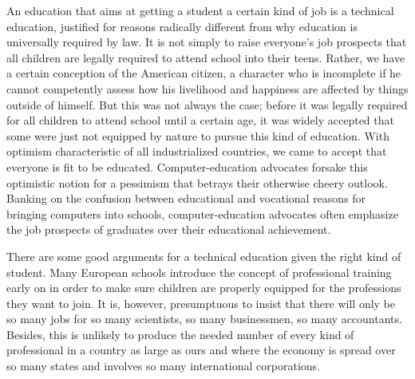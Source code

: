 An education that aims at getting a student a certain kind of job is a technical education, justified for reasons radically different from why education is universally required by law. It is not simply to raise everyone’s job prospects that all children are legally required to attend school into their teens. Rather, we have a certain conception of the American citizen, a character who is incomplete if he cannot competently assess how his livelihood and happiness are affected by things outside of himself. But this was not always the case; before it was legally required for all children to attend school until a certain age, it was widely accepted that some were just not equipped by nature to pursue this kind of education. With optimism characteristic of all industrialized countries, we came to accept that everyone is fit to be educated. Computer-education advocates forsake this optimistic notion for a pessimism that betrays their otherwise cheery outlook. Banking on the confusion between educational and vocational reasons for bringing computers into schools, computer-education advocates often emphasize the job prospects of graduates over their educational achievement.

There are some good arguments for a technical education given the right kind of student. Many European schools introduce the concept of professional training early on in order to make sure children are properly equipped for the professions they want to join. It is, however, presumptuous to insist that there will only be so many jobs for so many scientists, so many businessmen, so many accountants. Besides, this is unlikely to produce the needed number of every kind of professional in a country as large as ours and where the economy is spread over so many states and involves so many international corporations.

